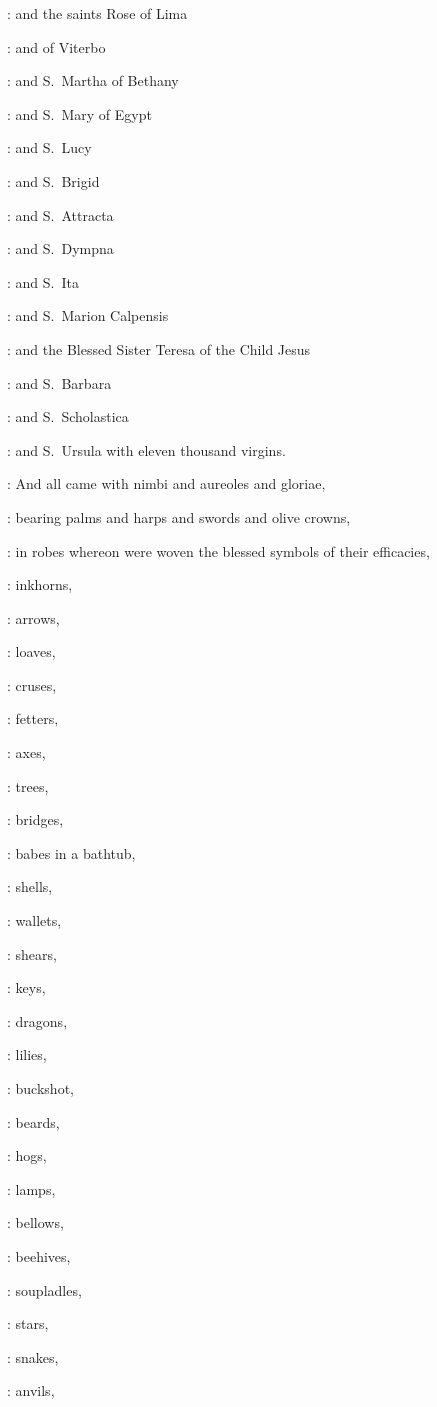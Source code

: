 :
and the saints Rose of Lima

:
and of Viterbo

:
and S.~Martha of Bethany

:
and S.~Mary of Egypt

:
and S.~Lucy

:
and S.~Brigid

:
and S.~Attracta

:
and S.~Dympna

:
and S.~Ita

:
and S.~Marion Calpensis

:
and the Blessed Sister Teresa of the Child Jesus

:
and S.~Barbara

:
and S.~Scholastica

:
and S.~Ursula with eleven thousand virgins.

:
And all came with nimbi and aureoles and gloriae,

:
bearing palms and harps and swords and olive crowns,

:
in robes whereon were woven the blessed symbols of their efficacies,

:
inkhorns,

:
arrows,

:
loaves,

:
cruses,

:
fetters,

:
axes,

:
trees,

:
bridges,

:
babes in a bathtub,

:
shells,

:
wallets,

:
shears,

:
keys,

:
dragons,

:
lilies,

:
buckshot,

:
beards,

:
hogs,

:
lamps,

:
bellows,

:
beehives,

:
soupladles,

:
stars,

:
snakes,

:
anvils,

